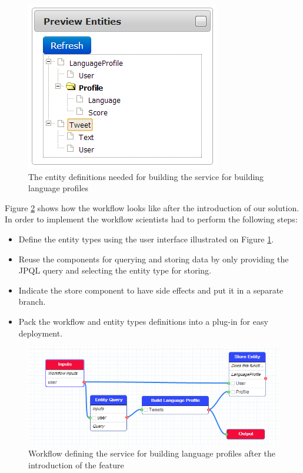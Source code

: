 \begin{figure}[h!]
  \centering
  	\includegraphics[scale=0.5]{storage/eval/entities.png}
  \caption{The entity definitions needed for building the service for building language profiles}
  \label{fig:storageEvalEntities}
\end{figure}

Figure \ref{fig:storageEvalAfter} shows how the workflow looks like after the introduction of our solution. In order to implement the workflow scientists had to perform the following steps:
\begin{itemize}
	\item Define the entity types using the user interface illustrated on Figure \ref{fig:storageEvalEntities}.
	\item Reuse the components for querying and storing data by only providing the JPQL query and selecting the entity type for storing.
	\item Indicate the store component to have side effects and put it in a separate branch.
	\item Pack the workflow and entity types definitions into a plug-in for easy deployment.
\end{itemize}

\begin{figure}[h!]
  \centering
  	\includegraphics[scale=0.5]{storage/eval/after.png}
  \caption{Workflow defining the service for building language profiles after the introduction of the feature}
  \label{fig:storageEvalAfter}
\end{figure}


